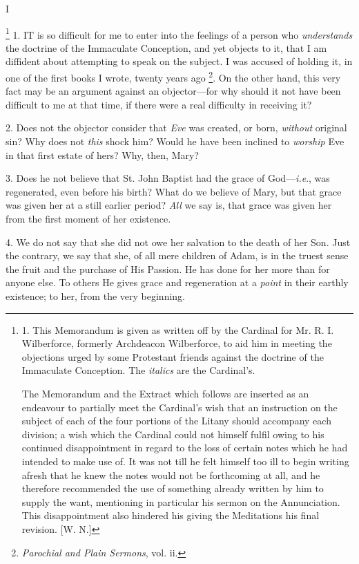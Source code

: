 I

\footnote{

1. This Memorandum is given as
written off by the Cardinal for Mr. R. I. Wilberforce, formerly
Archdeacon Wilberforce, to aid him in meeting the objections urged by
some Protestant friends against the doctrine of the Immaculate
Conception. The \emph{italics} are the Cardinal's.

The Memorandum and the Extract
which follows are inserted as an endeavour to partially meet the
Cardinal's wish that an instruction on the subject of each of the four
portions of the Litany should accompany each division; a wish which the
Cardinal could not himself fulfil owing to his continued disappointment
in regard to the loss of certain notes which he had intended to make use
of. It was not till he felt himself too ill to begin writing afresh that
he knew the notes would not be forthcoming at all, and he therefore
recommended the use of something already written by him to supply the
want, mentioning in particular his sermon on the Annunciation. This
disappointment also hindered his giving the Meditations his final
revision. [W. N.]} 1. IT
is so difficult for me to enter into the feelings of a person who \emph{understands}
the doctrine of the Immaculate Conception, and yet objects to it, that I
am diffident about attempting to speak on the subject. I was accused of
holding it, in one of the first books I wrote, twenty years ago \footnote{\emph{Parochial and Plain Sermons}, vol. ii.}. On the other hand, this very fact may be an argument
against an objector—for why should it not have been difficult to me at
that time, if there were a real difficulty in receiving it?

2. Does not the objector
consider that \emph{Eve} was created, or born, \emph{without} original
sin? Why does not \emph{this} shock him? Would he have been inclined to \emph{worship}
Eve in that first estate of hers? Why, then, Mary?

3. Does he not believe that St.
John Baptist had the grace of God—\emph{i.e}., was regenerated, even
before his birth? What do we believe of Mary, but that grace was given
her at a still earlier period? \emph{All} we say is, that grace was
given her from the first moment of her existence.

4. We do not say that she did
not owe her salvation to the death of her Son. Just the contrary, we say
that she, of all mere children of Adam, is in the truest sense the fruit
and the purchase of His Passion. He has done for her more than for
anyone else. To others He gives grace and regeneration at a \emph{point}
in their earthly existence; to her, from the very beginning.

